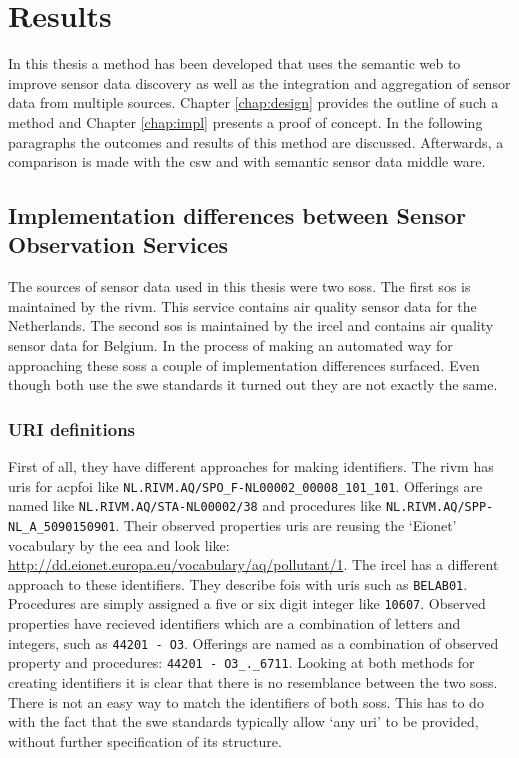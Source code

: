 

\chapter{Results}
\label{chap:results}

In this thesis a method has been developed that uses the semantic web to improve sensor data discovery as well as the integration and aggregation of sensor data from multiple sources. Chapter \ref{chap:design} provides the outline of such a method and Chapter \ref{chap:impl} presents a proof of concept. In the following paragraphs the outcomes and results of this method are discussed. Afterwards, a comparison is made with the \acf{csw} and with semantic sensor data middle ware. 

\section{Implementation differences between Sensor Observation Services}
\label{par:differences}
The sources of sensor data used in this thesis were two \aclp{sos}. The first \ac{sos} is maintained by the \acf{rivm}. This service contains air quality sensor data for the Netherlands. The second \ac{sos} is maintained by the \ac{ircel} and contains air quality sensor data for Belgium. In the process of making an automated way for approaching these \aclp{sos} a couple of implementation differences surfaced. Even though both use the \ac{swe} standards it turned out they are not exactly the same. 

\subsection{URI definitions}
\begin{sloppypar}
	First of all, they have different approaches for making identifiers. The \ac{rivm} has \acp{uri} for acp{foi} like \texttt{NL.RIVM.AQ/SPO\_F-NL00002\_00008\_101\_101}. Offerings are named like \texttt{NL.RIVM.AQ/STA-NL00002/38} and procedures like \texttt{NL.RIVM.AQ/SPP-NL\_A\_5090150901}. Their observed properties \acp{uri} are reusing the `Eionet' vocabulary by the \ac{eea} and look like: \url{http://dd.eionet.europa.eu/vocabulary/aq/pollutant/1}. The \ac{ircel} has a different approach to these identifiers. They describe \acp{foi} with \acp{uri} such as \texttt{BELAB01}. Procedures are simply assigned a five or six digit integer like \texttt{10607}. Observed properties have recieved identifiers which are a combination of letters and integers, such as \texttt{44201 - O3}. Offerings are named as a combination of observed property and procedures: \texttt{44201 - O3\_.\_6711}. Looking at both methods for creating identifiers it is clear that there is no resemblance between the two \aclp{sos}. There is not an easy way to match the identifiers of both \aclp{sos}. This has to do with the fact that the \ac{swe} standards typically allow `any \ac{uri}' to be provided, without further specification of its structure. 
\end{sloppypar}

